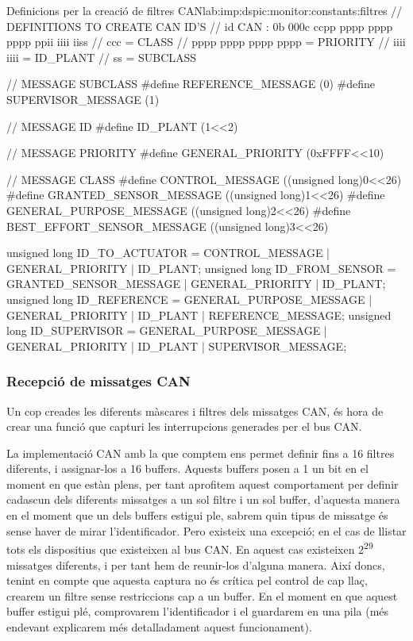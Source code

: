\begin{code_c}{Definicions per la creació de filtres CAN}{lab:imp:dspic:monitor:constants:filtres}
// DEFINITIONS TO CREATE CAN ID'S
// id CAN : 0b 000c ccpp pppp pppp pppp ppii iiii iiss
// ccc = CLASS
// pppp pppp pppp pppp = PRIORITY
// iiii iiii = ID_PLANT
// ss = SUBCLASS

// MESSAGE SUBCLASS
#define  REFERENCE_MESSAGE 			(0)
#define  SUPERVISOR_MESSAGE 		(1)

// MESSAGE ID
#define  ID_PLANT					(1<<2)

// MESSAGE PRIORITY
#define  GENERAL_PRIORITY			(0xFFFF<<10)

// MESSAGE CLASS
#define  CONTROL_MESSAGE 			((unsigned long)0<<26)
#define  GRANTED_SENSOR_MESSAGE 	((unsigned long)1<<26)
#define  GENERAL_PURPOSE_MESSAGE 	((unsigned long)2<<26)
#define  BEST_EFFORT_SENSOR_MESSAGE ((unsigned long)3<<26)

unsigned long ID_TO_ACTUATOR 	= CONTROL_MESSAGE 			| GENERAL_PRIORITY | ID_PLANT;
unsigned long ID_FROM_SENSOR	= GRANTED_SENSOR_MESSAGE 	| GENERAL_PRIORITY | ID_PLANT;
unsigned long ID_REFERENCE		= GENERAL_PURPOSE_MESSAGE 	| GENERAL_PRIORITY | ID_PLANT | REFERENCE_MESSAGE;
unsigned long ID_SUPERVISOR		= GENERAL_PURPOSE_MESSAGE 	| GENERAL_PRIORITY | ID_PLANT | SUPERVISOR_MESSAGE;
\end{code_c}


\subsubsection{Recepció de missatges CAN}\label{lab:imp:dspic:monitor:can:rx}

Un cop creades les diferents màscares i filtres dels missatges CAN, és hora de crear una funció que capturi les interrupcions generades per el bus CAN.

La implementació CAN amb la que comptem ens permet definir fins a 16 filtres diferents, i assignar-los a 16 buffers. Aquests buffers posen a 1 un bit en el moment en que estàn plens, per tant aprofitem aquest comportament per definir cadascun dels diferents missatges a un sol filtre i un sol buffer, d'aquesta manera en el moment que un dels buffers estigui ple, sabrem quin tipus de missatge és sense haver de mirar l'identificador. Pero existeix una excepció; en el cas de llistar tots els dispositius que existeixen al bus CAN. En aquest cas existeixen 2\textsuperscript{29} missatges diferents, i per tant hem de reunir-los d'alguna manera. Així doncs, tenint en compte que aquesta captura no és crítica pel control de cap llaç, crearem un filtre sense restriccions cap a un buffer. En el moment en que aquest buffer estigui plé, comprovarem l'identificador i el guardarem en una pila (més endevant explicarem més detalladament aquest funcionament).

